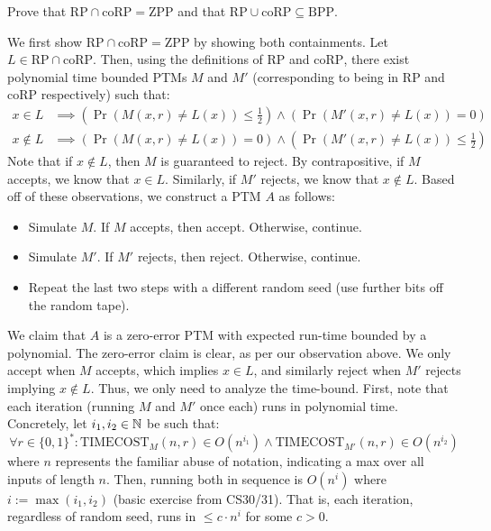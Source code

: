 \documentclass[12pt]{article}
\begin{document}



\begin{problem}{12}
Prove that \( \text{RP} \cap \text{coRP} = \text{ZPP} \) and that \( \text{RP} \cup \text{coRP} \subseteq \text{BPP} \).
\end{problem}

\begin{solution}
    We first show \( \text{RP} \cap \text{coRP} = \text{ZPP} \) by showing both containments. \bbni
    Let $L \in \text{RP} \cap \text{coRP}$. Then, using the definitions of $\text{RP}$ and $\text{coRP}$, there exist polynomial time bounded PTMs $M$ and $M'$ (corresponding to being in $\text{RP}$ and $\text{coRP}$ respectively) such that: 
    \begin{align*}
        x \in L &\implies \left(\Pr(M(x, r) \neq L(x)) \leq \frac{1}{2}\right) \land \left(\Pr(M'(x, r) \neq L(x)) = 0 \right) \\
        x \not \in L &\implies \left(\Pr(M(x, r) \neq L(x)) = 0 \right) \land \left(\Pr(M'(x, r) \neq L(x)) \leq \frac{1}{2}\right)
    \end{align*}
    Note that if $x \not \in L$, then $M$ is guaranteed to reject. By contrapositive, if $M$ accepts, we know that $x \in L$. Similarly, if $M'$ rejects, we know that $x \not \in L$. Based off of these observations, we construct a PTM $A$ as follows:
    \begin{itemize}
        \item Simulate $M$. If $M$ accepts, then accept. Otherwise, continue. 
        \item Simulate $M'$. If $M'$ rejects, then reject. Otherwise, continue.
        \item Repeat the last two steps with a different random seed (use further bits off the random tape).
    \end{itemize}
    We claim that $A$ is a zero-error PTM with expected run-time bounded by a polynomial. \bbni
    The zero-error claim is clear, as per our observation above. We only accept when $M$ accepts, which implies $x \in L$, and similarly reject when $M'$ rejects implying $x \not \in L$. Thus, we only need to analyze the time-bound. \bbni
    First, note that each iteration (running $M$ and $M'$ once each) runs in polynomial time. Concretely, let $i_1, i_2 \in \mathbb N$ be such that: 
    \[ \forall r \in \{0, 1\}^* : \text{TIMECOST}_{M}(n, r) \in O(n^{i_1}) \land \text{TIMECOST}_{M'}(n, r) \in O(n^{i_2})\]
    where $n$ represents the familiar abuse of notation, indicating a max over all inputs of length $n$. Then, running both in sequence is $O(n^{i})$ where $i := \max(i_1, i_2)$ (basic exercise from CS30/31). That is, each iteration, regardless of random seed, runs in $\leq c \cdot n^i$ for some $c > 0$. \bbni

\end{solution}
\end{document}
